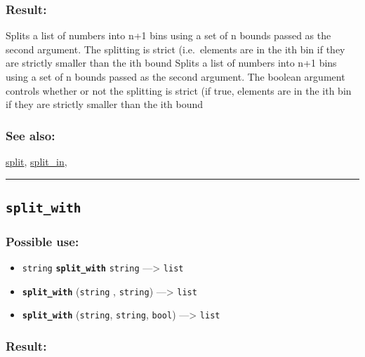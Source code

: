 \documentclass[]{book}
\providecommand{\tightlist}{%
  \setlength{\itemsep}{0pt}\setlength{\parskip}{0pt}}
\theoremstyle{definition}
\theoremstyle{definition}
\theoremstyle{definition}
\theoremstyle{remark}
\begin{document}
\subsubsection{Result:}\label{result-480}

Splits a list of numbers into n+1 bins using a set of n bounds passed as
the second argument. The splitting is strict (i.e.~elements are in the
ith bin if they are strictly smaller than the ith bound Splits a list of
numbers into n+1 bins using a set of n bounds passed as the second
argument. The boolean argument controls whether or not the splitting is
strict (if true, elements are in the ith bin if they are strictly
smaller than the ith bound

\subsubsection{See also:}\label{see-also-194}

\href{OperatorsSZ\#split}{split},
\href{OperatorsSZ\#split_in}{split\_in},

\begin{center}\rule{0.5\linewidth}{\linethickness}\end{center}

\subsection{\texorpdfstring{\texttt{split\_with}}{split\_with}}\label{split_with}

\subsubsection{Possible use:}\label{possible-use-497}

\begin{itemize}
\tightlist
\item
  \texttt{string} \textbf{\texttt{split\_with}} \texttt{string}
  ---\textgreater{} \texttt{list}
\item
  \textbf{\texttt{split\_with}} (\texttt{string} , \texttt{string})
  ---\textgreater{} \texttt{list}
\item
  \textbf{\texttt{split\_with}} (\texttt{string}, \texttt{string},
  \texttt{bool}) ---\textgreater{} \texttt{list}
\end{itemize}

\subsubsection{Result:}\label{result-481}
\end{document}
